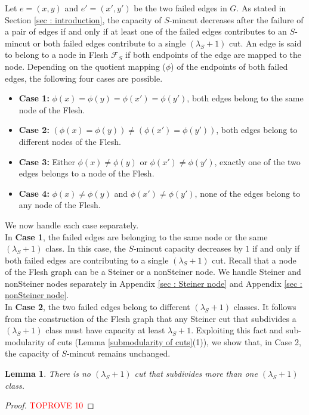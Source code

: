 \documentclass[letterpaper,11pt]{article}
\newtheorem{lemma}{Lemma}[]
\begin{document}
Let $e=(x,y)$ and $e'=(x',y')$ be the two failed edges in $G$. As stated in Section \ref{sec : introduction}, the capacity of $S$-mincut decreases after the failure of a pair of edges if and only if at least one of the failed edges contributes to an $S$-mincut or both failed edges contribute to a single $(\lambda_S+1)$ cut. An edge is said to belong to a node in Flesh ${\mathcal F}_S$ if both endpoints of the edge are mapped to the node.
Depending on the quotient mapping ($\phi$) of the endpoints of both failed edges, the following four cases are possible.
\begin{itemize}
    \item \textbf{Case 1:} $\phi(x)=\phi(y)=\phi(x')=\phi(y')$, both edges belong to the same node of the Flesh. 
    \item \textbf{Case 2:} $(\phi(x)=\phi(y))\ne(\phi(x')=\phi(y'))$, both edges belong to different nodes of the Flesh.
    \item \textbf{Case 3:} Either $\phi(x)\ne \phi(y)$ or $\phi(x') \ne \phi(y')$, exactly one of the two edges belongs to a node of the Flesh.
    \item \textbf{Case 4:} $\phi(x) \ne \phi(y)$ and $\phi(x') \ne \phi(y')$, none of the edges belong to any node of the Flesh.
\end{itemize}
We now handle each case separately.\\

\noindent
In \textbf{Case 1}, the failed edges are belonging to the same node or the same $(\lambda_S+1)$ class. In this case, the $S$-mincut capacity decreases by $1$ if and only if both failed edges are contributing to a single $(\lambda_S+1)$ cut. Recall that a node of the Flesh graph can be a Steiner or a nonSteiner node. We handle Steiner and nonSteiner nodes separately in Appendix \ref{sec : Steiner node} and Appendix \ref{sec : nonSteiner node}.\\



\noindent
In \textbf{Case 2}, the two failed edges belong to different $(\lambda_S+1)$ classes.
It follows from the construction of the Flesh graph that any Steiner cut that subdivides a $(\lambda_S+1)$ class must have capacity at least $\lambda_S+1$. Exploiting this fact and sub-modularity of cuts (Lemma \ref{submodularity of cuts}(1)), we show that, in Case 2, the capacity of $S$-mincut remains unchanged.
\begin{lemma} \label{lem : subdivides at most one class}
    There is no $(\lambda_S+1)$ cut that subdivides more than one $(\lambda_S+1)$ class.
\end{lemma}
\begin{proof}\textcolor{red}{TOPROVE 10}\end{proof}
\end{document}
